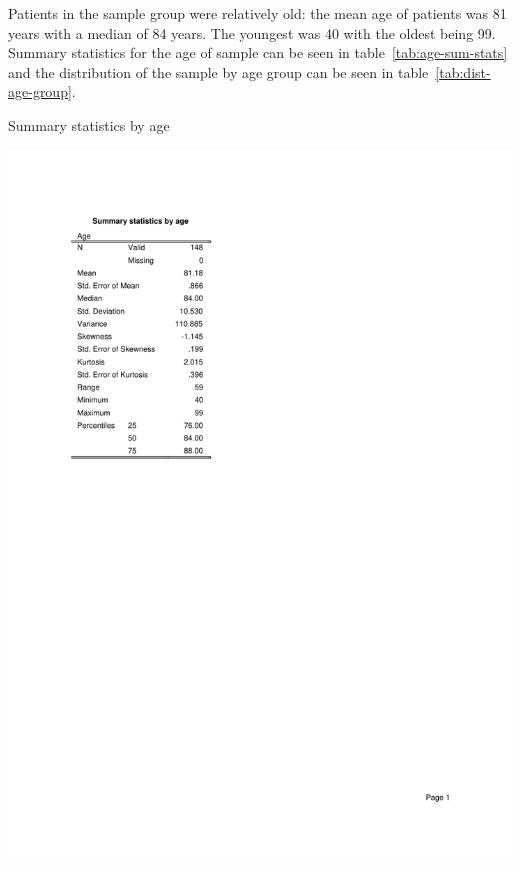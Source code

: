 \documentclass
[
	12pt,
	a4paper,
	oneside,
]{report}
\begin{document}
Patients in the sample group were relatively old: the mean age of patients was 
81 years with a median of 84 years. The youngest was 40 with the oldest being 
99. Summary statistics for the age of sample can be seen in 
table~\ref{tab:age-sum-stats} and the distribution of the sample by age group 
can be seen in table~\ref{tab:dist-age-group}.
\begin{table}[ht]
\caption{Summary statistics by age}
\label{tab:age-sum-stats}
\includegraphics[width=\textwidth,
	trim={2.5cm 14cm 2.5cm 2.5cm},
	clip]{media/age-sum-stats}
\end{table}
\end{document}
